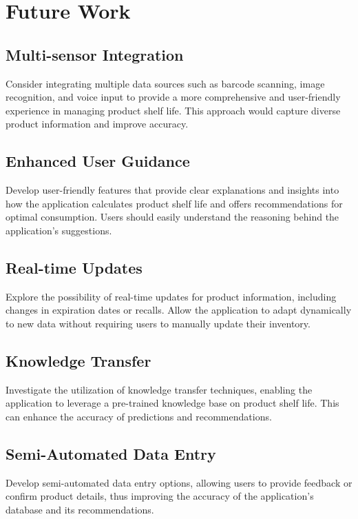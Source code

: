 \chapter{Future Work}



\section{ Multi-sensor Integration}
Consider integrating multiple data sources such as barcode scanning, image recognition, and voice input to provide a more comprehensive and user-friendly experience in managing product shelf life. This approach would capture diverse product information and improve accuracy.

\section{ Enhanced User Guidance}
Develop user-friendly features that provide clear explanations and insights into how the application calculates product shelf life and offers recommendations for optimal consumption. Users should easily understand the reasoning behind the application's suggestions.

\section{ Real-time Updates}
Explore the possibility of real-time updates for product information, including changes in expiration dates or recalls. Allow the application to adapt dynamically to new data without requiring users to manually update their inventory.

\section{ Knowledge Transfer}
Investigate the utilization of knowledge transfer techniques, enabling the application to leverage a pre-trained knowledge base on product shelf life. This can enhance the accuracy of predictions and recommendations.

\section{ Semi-Automated Data Entry}
Develop semi-automated data entry options, allowing users to provide feedback or confirm product details, thus improving the accuracy of the application's database and its recommendations.

